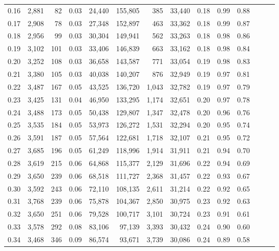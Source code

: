\begin{tabular}{rrrrrrrrrrrrrr}
0.16 &  2,881 &   82 &  0.03 &   24,440 &  155,805 &     385 &  33,440 &  0.18 &  0.99 &      0.88 \\
0.17 &  2,908 &   78 &  0.03 &   27,348 &  152,897 &     463 &  33,362 &  0.18 &  0.99 &      0.87 \\
0.18 &  2,956 &   99 &  0.03 &   30,304 &  149,941 &     562 &  33,263 &  0.18 &  0.98 &      0.86 \\
0.19 &  3,102 &  101 &  0.03 &   33,406 &  146,839 &     663 &  33,162 &  0.18 &  0.98 &      0.84 \\
0.20 &  3,252 &  108 &  0.03 &   36,658 &  143,587 &     771 &  33,054 &  0.19 &  0.98 &      0.83 \\
0.21 &  3,380 &  105 &  0.03 &   40,038 &  140,207 &     876 &  32,949 &  0.19 &  0.97 &      0.81 \\
0.22 &  3,487 &  167 &  0.05 &   43,525 &  136,720 &   1,043 &  32,782 &  0.19 &  0.97 &      0.79 \\
0.23 &  3,425 &  131 &  0.04 &   46,950 &  133,295 &   1,174 &  32,651 &  0.20 &  0.97 &      0.78 \\
0.24 &  3,488 &  173 &  0.05 &   50,438 &  129,807 &   1,347 &  32,478 &  0.20 &  0.96 &      0.76 \\
0.25 &  3,535 &  184 &  0.05 &   53,973 &  126,272 &   1,531 &  32,294 &  0.20 &  0.95 &      0.74 \\
0.26 &  3,591 &  187 &  0.05 &   57,564 &  122,681 &   1,718 &  32,107 &  0.21 &  0.95 &      0.72 \\
0.27 &  3,685 &  196 &  0.05 &   61,249 &  118,996 &   1,914 &  31,911 &  0.21 &  0.94 &      0.70 \\
0.28 &  3,619 &  215 &  0.06 &   64,868 &  115,377 &   2,129 &  31,696 &  0.22 &  0.94 &      0.69 \\
0.29 &  3,650 &  239 &  0.06 &   68,518 &  111,727 &   2,368 &  31,457 &  0.22 &  0.93 &      0.67 \\
0.30 &  3,592 &  243 &  0.06 &   72,110 &  108,135 &   2,611 &  31,214 &  0.22 &  0.92 &      0.65 \\
0.31 &  3,768 &  239 &  0.06 &   75,878 &  104,367 &   2,850 &  30,975 &  0.23 &  0.92 &      0.63 \\
0.32 &  3,650 &  251 &  0.06 &   79,528 &  100,717 &   3,101 &  30,724 &  0.23 &  0.91 &      0.61 \\
0.33 &  3,578 &  292 &  0.08 &   83,106 &   97,139 &   3,393 &  30,432 &  0.24 &  0.90 &      0.60 \\
0.34 &  3,468 &  346 &  0.09 &   86,574 &   93,671 &   3,739 &  30,086 &  0.24 &  0.89 &      0.58 \\

\end{tabular}
